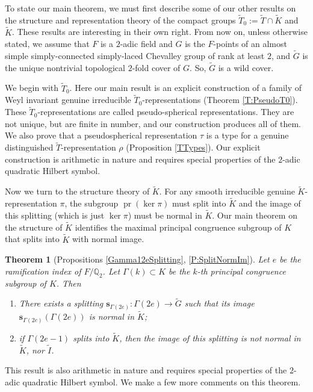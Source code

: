 \documentclass[10pt, letterpaper]{amsart}
\theoremstyle{plain}
\newtheorem{Thm}[equation]{Theorem}
\theoremstyle{definition}
\numberwithin{equation}{section}
\newcommand{\pr}{\operatorname{pr}}
\newcommand{\Gt}{\widetilde{G}}
\newcommand{\It}{\widetilde{I}}
\newcommand{\Kt}{\widetilde{K}}
\newcommand{\Tt}{\widetilde{T}}
\newcommand{\s}{\mathbf{s}}
\begin{document}
To state our main theorem, we must first describe some of our other results on the structure and representation theory of the compact groups $\Tt_{0}:=\Tt\cap \Kt$ and $\Kt$. These results are interesting in their own right. From now on, unless otherwise stated, we assume that $F$ is a $2$-adic field and $G$ is the $F$-points of an almost simple simply-connected simply-laced Chevalley group of rank at least $2$, and $\Gt$ is the unique nontrivial topological $2$-fold cover of $G$. So, $\Gt$ is a wild cover.

We begin with $\Tt_{0}$. Here our main result is an explicit construction of a family of Weyl invariant genuine irreducible $\Tt_{0}$-representations (Theorem \ref{T:PseudoT0}). These $\Tt_{0}$-representations are called pseudo-spherical representations. They are not unique, but are finite in number, and our construction produces all of them. We also prove that a pseudospherical representation $\tau$ is a type for a genuine distinguished $\Tt$-representation $\rho$ (Proposition \ref{TTypes}). Our explicit construction is arithmetic in nature and requires special properties of the $2$-adic quadratic Hilbert symbol.

Now we turn to the structure theory of $\Kt$. For any smooth irreducible genuine $\Kt$-representation $\pi$, the subgroup $\pr(\ker\pi)$ must split into $\Kt$ and the image of this splitting (which is just $\ker\pi$) must be normal in $\Kt$. Our main theorem on the structure of $\Kt$ identifies the maximal principal congruence subgroup of $K$ that splits into $\Kt$ with normal image.

\begin{Thm}[Propositions \ref{Gamma12eSplitting}, \ref{P:SplitNormIm}]
    Let $e$ be the ramification index of $F/\mathbb{Q}_{2}$. Let $\Gamma(k)\subset K$ be the $k$-th principal congruence subgroup of $K$. Then
    \begin{enumerate}
        \item There exists a splitting $\s_{\Gamma(2e)}:\Gamma(2e)\rightarrow \Gt$ such that its image $\s_{\Gamma(2e)}(\Gamma(2e))$ is normal in $\Kt$;
        \item if $\Gamma(2e-1)$ splits into $\Kt$, then the image of this splitting is not normal in $\Kt$, nor $\It$.
    \end{enumerate}
\end{Thm}
This result is also arithmetic in nature and requires special properties of the $2$-adic quadratic Hilbert symbol. We make a few more comments on this theorem.
\end{document}
